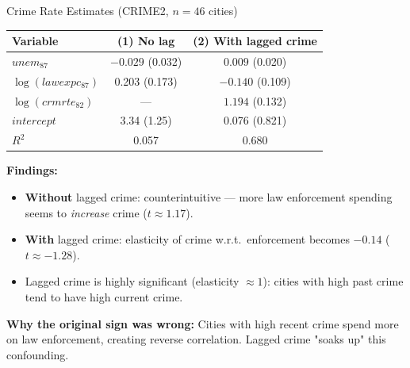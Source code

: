 \documentclass[aspectratio=169, 12pt]{beamer}
\begin{document}
\begin{frame}[shrink=20]{Crime Rate Estimates (CRIME2, $n = 46$ cities)}

  \begin{center}\footnotesize
  \begin{tabular}{l|cc}
  \hline
  Variable & (1) No lag & (2) With lagged crime \\
  \hline
  $unem_{87}$ & $-0.029$ (0.032) & $0.009$ (0.020) \\
  $\log(lawexpc_{87})$ & 0.203 (0.173) & $-0.140$ (0.109) \\
  $\log(crmrte_{82})$ & --- & $1.194$ (0.132) \\
  $intercept$ & 3.34 (1.25) & 0.076 (0.821) \\
  \hline
  $R^2$ & 0.057 & 0.680 \\
  \hline
  \end{tabular}
  \end{center}

  \begin{highlightbox}
    \textbf{Findings:}
    \begin{itemize}\setlength{\itemsep}{1pt}
      \item \textbf{Without} lagged crime: counterintuitive — more law enforcement spending
      seems to \emph{increase} crime ($t \approx 1.17$).
      \item \textbf{With} lagged crime: elasticity of crime w.r.t.\ enforcement becomes
      $-0.14$ ($t \approx -1.28$).
      \item Lagged crime is highly significant (elasticity $\approx 1$): cities with high
      past crime tend to have high current crime.
    \end{itemize}
  \end{highlightbox}

  \textbf{Why the original sign was wrong:} Cities with high recent crime spend more on law
  enforcement, creating reverse correlation. Lagged crime "soaks up" this confounding.

\end{frame}
\end{document}
